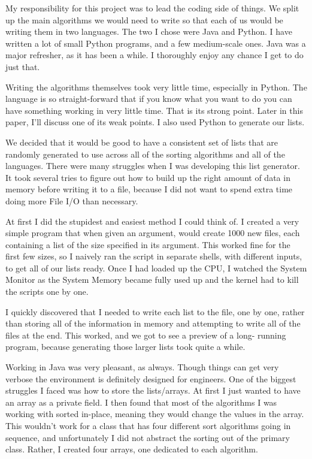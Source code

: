 My responsibility for this project was to lead the coding side of things. We
split up the main algorithms we would need to write so that each of us would be
writing them in two languages. The two I chose were Java and Python. I have
written a lot of small Python programs, and a few medium-scale ones. Java was a
major refresher, as it has been a while. I thoroughly enjoy any chance I get to
do just that. 

Writing the algorithms themselves took very little time, especially in Python. 
The language is so straight-forward that if you know what you want to do you 
can have something working in very little time. That is its strong point. Later 
in this paper, I'll discuss one of its weak points. I also used Python to 
generate our lists. 

We decided that it would be good to have a consistent set of lists that are 
randomly generated to use across all of the sorting algorithms and all of the 
languages. There were many struggles when I was developing this list generator. 
It took several tries to figure out how to build up the right amount of data in 
memory before writing it to a file, because I did not want to spend extra time 
doing more File I/O than necessary. 

At first I did the stupidest and easiest method I could think of. I created a 
very simple program that when given an argument, would create 1000 new files, 
each containing a list of the size specified in its argument. This worked fine 
for the first few sizes, so I naively ran the script in separate shells, with 
different inputs, to get all of our lists ready. Once I had loaded up the CPU, I 
watched the System Monitor as the System Memory became fully used up and the 
kernel had to kill the scripts one by one.

I quickly discovered that I needed to write each list to the file, one by one,
rather than storing all of the information in memory and attempting to write all
of the files at the end. This worked, and we got to see a preview of a long-
running program, because generating those larger lists took quite a while.

Working in Java was very pleasant, as always. Though things can get very verbose
the environment is definitely designed for engineers. One of the biggest
struggles I faced was how to store the lists/arrays. At first I just wanted to
have an array as a private field. I then found that most of the algorithms I was
working with sorted in-place, meaning they would change the values in the array.
This wouldn't work for a class that has four different sort algorithms going in
sequence, and unfortunately I did not abstract the sorting out of the primary
class. Rather, I created four arrays, one dedicated to each algorithm.

